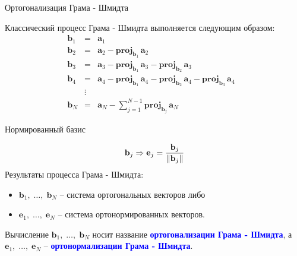 \documentclass[10pt,xcolor=pst,aspectratio=169]{beamer}
\begin{document}
\begin{frame}{Ортогонализация Грама - Шмидта}

	\transdissolve[duration=0.2]
	\justifying
	\large
	Классический процесс Грама - Шмидта выполняется следующим образом:
	\[
		\begin{array}{lclr}
			\mathbf{b}_1 & = & \mathbf{a}_1 & \\
			\mathbf{b}_2 & = & \mathbf{a}_2-\mathbf{proj}_{\mathbf{b}_1}\,\mathbf{a}_2 & \\
			\mathbf{b}_3 & = & \mathbf{a}_3-\mathbf{proj}_{\mathbf{b}_1}\,\mathbf{a}_3-\mathbf{proj}_{\mathbf{b}_2}\,\mathbf{a}_3 & \\
			\mathbf{b}_4 & = & \mathbf{a}_4-\mathbf{proj}_{\mathbf{b}_1}\,\mathbf{a}_4-\mathbf{proj}_{\mathbf{b}_2}\,\mathbf{a}_4-\mathbf{proj}_{\mathbf{b}_3}\,\mathbf{a}_4 & \\
			& \vdots & & \\
			\mathbf{b}_N & = & \mathbf{a}_N-\displaystyle\sum_{j=1}^{N-1}\mathbf{proj}_{\mathbf{b}_j}\,\mathbf{a}_N & \end{array}
    \]

\end{frame}

\begin{frame}{Нормированный базис}

	\transdissolve[duration=0.2]
	\justifying
	\large
	\[
		\mathbf{b}_j \Rightarrow \mathbf{e}_j = {\mathbf{b}_j \over \| \mathbf{b}_j \|}
	\]
	Результаты процесса Грама - Шмидта:
	\begin{itemize}
		\justifying
		\item $\mathbf{b}_1,\;\ldots,\;\mathbf{b}_N$ -- система ортогональных векторов либо
		\item $\mathbf{e}_1,\;\ldots,\;\mathbf{e}_N$ -- система ортонормированных векторов.
	\end{itemize}
	\begin{block}{}
		\justifying
		Вычисление $\mathbf{b}_1,\;\ldots,\;\mathbf{b}_N$ носит название \textbf{\textcolor{blue}{ортогонализации Грама - Шмидта}}, а $\mathbf{e}_1,\;\ldots,\;\mathbf{e}_N$ -- \textbf{\textcolor{blue}{ортонормализации Грама - Шмидта}}.
	\end{block}

\end{frame}
\end{document}
